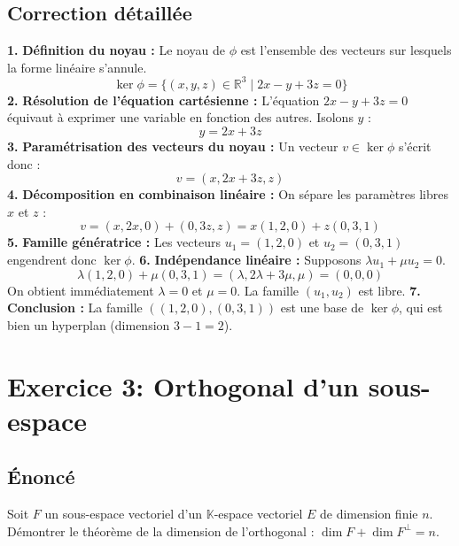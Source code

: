 \documentclass[12pt,a4paper]{report}
\begin{document}
\section{Correction détaillée}
\textbf{1.} \textbf{Définition du noyau :} Le noyau de $\phi$ est l'ensemble des vecteurs sur lesquels la forme linéaire s'annule.
   $$\ker \phi = \{ (x,y,z) \in \mathbb{R}^3 \mid 2x - y + 3z = 0 \}$$
\textbf{2.} \textbf{Résolution de l'équation cartésienne :} L'équation $2x - y + 3z = 0$ équivaut à exprimer une variable en fonction des autres. Isolons $y$ :
   $$y = 2x + 3z$$
\textbf{3.} \textbf{Paramétrisation des vecteurs du noyau :} Un vecteur $v \in \ker \phi$ s'écrit donc :
   $$v = (x, 2x+3z, z)$$
\textbf{4.} \textbf{Décomposition en combinaison linéaire :} On sépare les paramètres libres $x$ et $z$ :
   $$v = (x, 2x, 0) + (0, 3z, z) = x(1, 2, 0) + z(0, 3, 1)$$
\textbf{5.} \textbf{Famille génératrice :} Les vecteurs $u_1 = (1, 2, 0)$ et $u_2 = (0, 3, 1)$ engendrent donc $\ker \phi$.
\textbf{6.} \textbf{Indépendance linéaire :} Supposons $\lambda u_1 + \mu u_2 = 0$.
   $$\lambda(1, 2, 0) + \mu(0, 3, 1) = (\lambda, 2\lambda+3\mu, \mu) = (0, 0, 0)$$
   On obtient immédiatement $\lambda = 0$ et $\mu = 0$. La famille $(u_1, u_2)$ est libre.
\textbf{7.} \textbf{Conclusion :} La famille $((1,2,0), (0,3,1))$ est une base de $\ker \phi$, qui est bien un hyperplan (dimension $3 - 1 = 2$).

\newpage
\chapter{Exercice 3: Orthogonal d'un sous-espace}
\section{Énoncé}
Soit $F$ un sous-espace vectoriel d'un $\mathbb{K}$-espace vectoriel $E$ de dimension finie $n$. Démontrer le théorème de la dimension de l'orthogonal : $\dim F + \dim F^\perp = n$.
\end{document}
